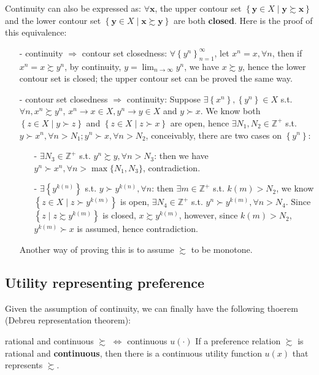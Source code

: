 Continuity can also be expressed as: $\forall \mathbf{x}$, the upper contour set $\left\{\mathbf{y}\in X\mid \mathbf{y}\succsim \mathbf{x} \right\}$ and the lower contour set $\left\{\mathbf{y}\in X\mid \mathbf{x}\succsim \mathbf{y} \right\}$ are both \textbf{closed}. Here is the proof of this equivalence: 
\begin{enumerate}
    \item[-] continuity $\Rightarrow$ contour set closedness: $\forall \left\{y^n\right\}^{\infty}_{n=1}$, let $x^n=x,\forall n$, then if $x^n=x\succsim y^n$, by continuity, $y=\lim_{n\rightarrow \infty}y^n$, we have $x\succsim y$, hence the lower contour set is closed; the upper contour set can be proved the same way.
    \item[-] contour set closedness $\Rightarrow$ continuity: Suppose $\exists \left\{x^n\right\},\left\{y^n\right\}\in X$ s.t. $\forall n, x^n\succsim y^n$, $x^n\rightarrow x\in X, y^n\rightarrow y\in X$ and $y\succ x$. We know both $\left\{z\in X\mid y\succ z \right\}$ and $\left\{z\in X\mid z\succ x \right\}$ are open, hence $\exists N_1,N_2\in \mathbb{Z}^+$ s.t. $y\succ x^n,\forall n>N_1; y^n\succ x,\forall n>N_2$, conceivably, there are two cases on $\left\{y^n\right\}$:
    \begin{enumerate}
        \item[-] $\exists N_3 \in \mathbb{Z}^+$ s.t. $y^n\succsim y, \forall n>N_3$: then we have $y^n\succ x^n,\forall n>\max\{N_1,N_3\}$, contradiction.
        \item[-] $\exists \left\{y^{k(n)}\right\}$ s.t. $y\succ y^{k(n)},\forall n$: then $\exists m\in \mathbb{Z}^+$ s.t. $k(m)>N_2$, we know $\left\{z\in X\mid z\succ y^{k(m)}\right\}$ is open, $\exists N_4\in \mathbb{Z}^+$ s.t. $y^n\succ y^{k(m)}, \forall n>N_4$. Since $\left\{z\mid z\succsim y^{k(m)}\right\}$ is closed, $x\succsim y^{k(m)}$, however, since $k(m)>N_2$, $y^{k(m)}\succ x$ is assumed, hence contradiction.
    \end{enumerate} 
    Another way of proving this is to assume $\succsim$ to be monotone.
\end{enumerate}

\subsection{Utility representing preference}
Given the assumption of continuity, we can finally have the following thoerem (Debreu representation theorem):
\begin{theorem}{rational and continuous $\succsim$ $\Leftrightarrow$ continuous $u(\cdot)$}{}
    If a preference relation $\succsim$ is rational and \textbf{continuous}, then there is a continuous utility function $u(x)$ that represents $\succsim$.
\end{theorem}

